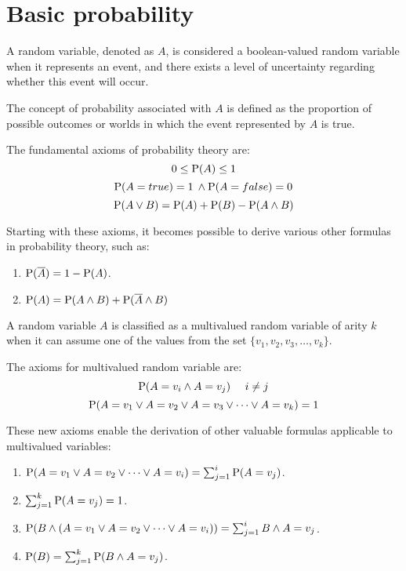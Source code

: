 \section{Basic probability}

\begin{definition}
    A random variable, denoted as $A$, is considered a boolean-valued random variable when it represents an event, and there exists a level of uncertainty regarding whether this event will occur.
\end{definition}
\begin{definition}
    The concept of probability associated with $A$ is defined as the proportion of possible outcomes or worlds in which the event represented by $A$ is true.    
\end{definition}
\begin{theorem}
    The fundamental axioms of probability theory are: 
    \[0 \leq \textnormal{P}(A) \leq 1\]
    \[\textnormal{P}(A=true) = 1 \: \land \textnormal{P}(A=false) = 0\]
    \[\textnormal{P}(A \lor B)=\textnormal{P}(A)+\textnormal{P}(B)-\textnormal{P}(A \land B)\]
\end{theorem}
Starting with these axioms, it becomes possible to derive various other formulas in probability theory, such as:
\begin{enumerate}
    \item $\textnormal{P}(\overline{A})=1-\textnormal{P}(A)$.
    \item $\textnormal{P}(A)=\textnormal{P}(A \land B)+\textnormal{P}(\overline{A} \land B)$
\end{enumerate}
\begin{definition}
    A random variable $A$ is classified as a multivalued random variable of arity $k$ when it can assume one of the values from the set $\{v_1, v_2, v_3, \dots, v_k\}$. 
\end{definition}
\begin{theorem}
    The axioms for multivalued random variable are: 
    \[\textnormal{P}(A=v_i \land A=v_j) \:\:\:\:\:\: i \neq j\]
    \[\textnormal{P}(A=v_1 \lor A=v_2 \lor A=v_3 \lor \dots \lor A=v_k)=1\]
\end{theorem}
These new axioms enable the derivation of other valuable formulas applicable to multivalued variables:    \begin{enumerate}
    \item $\textnormal{P}(A=v_1 \lor A=v_2 \lor \dots \lor A=v_i)=\sum_{j=1}^{i}{\textnormal{P}(A=v_j)}$.
    \item $\sum_{j=1}^{k}{\textnormal{P}(A=v_j)}=1$. 
    \item $\textnormal{P}(B \land (A=v_1 \lor A=v_2 \lor \dots \lor A=v_i))=\sum_{j=1}^{i}{B \land A=v_j}$. 
    \item $\textnormal{P}(B)=\sum_{j=1}^{k}{\textnormal{P}(B \land A=v_j)}$.
\end{enumerate}
